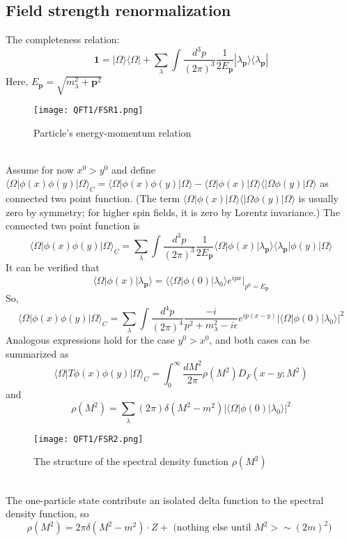 \subsection{Field strength renormalization}
\noindent
The completeness relation:
\[\bm{1} = |\Omega\rangle\langle\Omega| +  \sum_{\lambda} \int \frac{d^3p}{(2\pi)^3} \frac{1}{2E_{\bm{p}}} |\lambda_{\bm{p}}\rangle\langle\lambda_{\bm{p}}|\]
Here, $E_{\bm{p}} = \sqrt{m_{\lambda}^2 + \bm{p}^2}$\\
\begin{figure}[!h]
\centering
\texttt{[image: QFT1/FSR1.png]}
\caption{Particle's energy-momentum relation}
\end{figure}
\\
Assume for now $x^0 > y^0$ and define $\langle \Omega | \phi(x) \phi(y) | \Omega \rangle_{C} = \langle \Omega | \phi(x) \phi(y) | \Omega \rangle - \langle \Omega | \phi(x)| \Omega \rangle \langle | \Omega \phi(y) | \Omega \rangle$ as connected two point function. (The term $\langle \Omega | \phi(x)| \Omega \rangle \langle | \Omega \phi(y) | \Omega \rangle$ is usually zero by symmetry; for higher spin fields, it is zero by Lorentz invariance.) The connected two point function is
\[\langle \Omega | \phi(x) \phi(y) | \Omega \rangle_{C} = \sum_{\lambda} \int \frac{d^3p}{(2\pi)^3} \frac{1}{2E_{\bm{p}}} \langle \Omega | \phi(x) |\lambda_{\bm{p}}\rangle\langle\lambda_{\bm{p}}| \phi(y) | \Omega \rangle\]
It can be verified that
\[\langle \Omega | \phi(x) |\lambda_{\bm{p}}\rangle = \langle \langle \Omega | \phi(0) | \lambda_0 \rangle e^{ipx} |_{p^0 = E_{\bm{p}}}\]
So,
\[\langle \Omega | \phi(x) \phi(y) | \Omega \rangle_C = \sum_{\lambda} \int \frac{d^4p}{(2\pi)^4} \frac{-i}{p^2 + m_{\lambda}^2 -i\epsilon} e^{ip(x-y)} |\langle \Omega | \phi(0) | \lambda_0 \rangle|^2\]
Analogous expressions hold for the case $y^0 > x^0$, and both cases can be summarized as
\[\langle \Omega | T \phi(x) \phi(y) | \Omega \rangle_C = \int_0^{\infty} \frac{dM^2}{2\pi} \rho(M^2) D_F(x-y;M^2)\]
and 
\[\rho(M^2) = \sum_{\lambda} (2\pi) \delta(M^2-m^2)|\langle \Omega | \phi(0) | \lambda_0 \rangle|^2 \]
\begin{figure}[!h]
\centering
\texttt{[image: QFT1/FSR2.png]}
\caption{The structure of the spectral density function $\rho(M^2)$}
\end{figure}\\
The one-particle state contribute an isolated delta function to the spectral density function, so
\[\rho(M^2) = 2\pi \delta (M^2 -m^2) \cdot Z + \mbox{ (nothing else until $M^2 > \sim (2m)^2$) }\]
